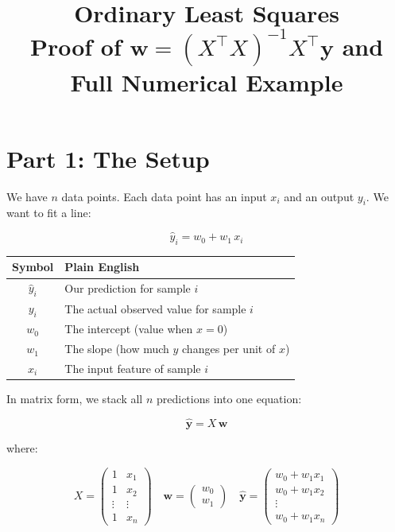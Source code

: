 \documentclass[11pt, a4paper]{article}
\title{\color{secblue}\textbf{Ordinary Least Squares}\\[0.3em]
\Large Proof of $\mathbf{w} = (X^\top X)^{-1} X^\top \mathbf{y}$ and Full Numerical Example}
\author{}
\date{}
\begin{document}
\maketitle
\thispagestyle{fancy}


\section*{\color{secblue}Part 1: The Setup}

We have $n$ data points. Each data point has an input $x_i$ and an output $y_i$.
We want to fit a line:

\begin{equation}
\hat{y}_i = w_0 + w_1 \, x_i
\tag{OLS-1}
\end{equation}

\begin{center}
\begin{tabular}{cl}
\toprule
\textbf{Symbol} & \textbf{Plain English} \\
\midrule
$\hat{y}_i$ & Our prediction for sample $i$ \\
$y_i$ & The actual observed value for sample $i$ \\
$w_0$ & The intercept (value when $x = 0$) \\
$w_1$ & The slope (how much $y$ changes per unit of $x$) \\
$x_i$ & The input feature of sample $i$ \\
\bottomrule
\end{tabular}
\end{center}

In matrix form, we stack all $n$ predictions into one equation:

\begin{equation}
\hat{\mathbf{y}} = X \, \mathbf{w}
\tag{OLS-2}
\end{equation}

where:

\begin{equation}
X = \begin{pmatrix} 1 & x_1 \\ 1 & x_2 \\ \vdots & \vdots \\ 1 & x_n \end{pmatrix}
\quad
\mathbf{w} = \begin{pmatrix} w_0 \\ w_1 \end{pmatrix}
\quad
\hat{\mathbf{y}} = \begin{pmatrix} w_0 + w_1 x_1 \\ w_0 + w_1 x_2 \\ \vdots \\ w_0 + w_1 x_n \end{pmatrix}
\tag{OLS-3}
\end{equation}
\end{document}
